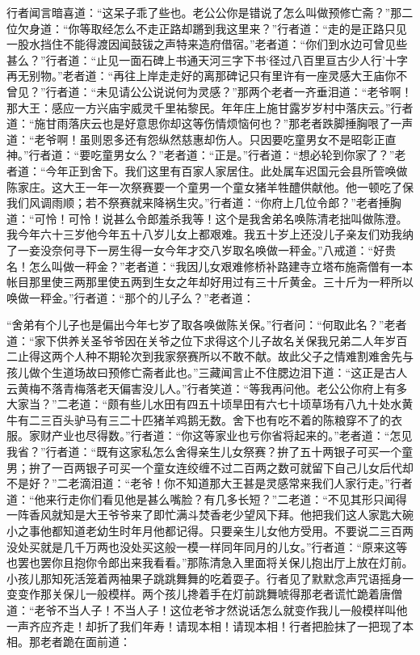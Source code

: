 \documentclass[12pt,UTF8]{ctexbook}
\begin{document}
行者闻言暗喜道：“这呆子乖了些也。老公公你是错说了怎么叫做预修亡斋？”那二位欠身道：“你等取经怎么不走正路却蹡到我这里来？”行者道：“走的是正路只见一股水挡住不能得渡因闻鼓钹之声特来造府借宿。”老者道：“你们到水边可曾见些甚么？”行者道：“止见一面石碑上书通天河三字下书‘径过八百里亘古少人行’十字再无别物。”老者道：“再往上岸走走好的离那碑记只有里许有一座灵感大王庙你不曾见？”行者道：“未见请公公说说何为灵感？”那两个老者一齐垂泪道：“老爷啊！那大王：感应一方兴庙宇威灵千里祐黎民。年年庄上施甘露岁岁村中落庆云。”行者道：“施甘雨落庆云也是好意思你却这等伤情烦恼何也？”那老者跌脚捶胸哏了一声道：“老爷啊！虽则恩多还有怨纵然慈惠却伤人。只因要吃童男女不是昭彰正直神。”行者道：“要吃童男女么？”老者道：“正是。”行者道：“想必轮到你家了？”老者道：“今年正到舍下。我们这里有百家人家居住。此处属车迟国元会县所管唤做陈家庄。这大王一年一次祭赛要一个童男一个童女猪羊牲醴供献他。他一顿吃了保我们风调雨顺；若不祭赛就来降祸生灾。”行者道：“你府上几位令郎？”老者捶胸道：“可怜！可怜！说甚么令郎羞杀我等！这个是我舍弟名唤陈清老拙叫做陈澄。我今年六十三岁他今年五十八岁儿女上都艰难。我五十岁上还没儿子亲友们劝我纳了一妾没奈何寻下一房生得一女今年才交八岁取名唤做一秤金。”八戒道：“好贵名！怎么叫做一秤金？”老者道：“我因儿女艰难修桥补路建寺立塔布施斋僧有一本帐目那里使三两那里使五两到生女之年却好用过有三十斤黄金。三十斤为一秤所以唤做一秤金。”行者道：“那个的儿子么？”老者道：

“舍弟有个儿子也是偏出今年七岁了取各唤做陈关保。”行者问：“何取此名？”老者道：“家下供养关圣爷爷因在关爷之位下求得这个儿子故名关保我兄弟二人年岁百二止得这两个人种不期轮次到我家祭赛所以不敢不献。故此父子之情难割难舍先与孩儿做个生道场故曰预修亡斋者此也。”三藏闻言止不住腮边泪下道：“这正是古人云黄梅不落青梅落老天偏害没儿人。”行者笑道：“等我再问他。老公公你府上有多大家当？”二老道：“颇有些儿水田有四五十顷旱田有六七十顷草场有八九十处水黄牛有二三百头驴马有三二十匹猪羊鸡鹅无数。舍下也有吃不着的陈粮穿不了的衣服。家财产业也尽得数。”行者道：“你这等家业也亏你省将起来的。”老者道：“怎见我省？”行者道：“既有这家私怎么舍得亲生儿女祭赛？拚了五十两银子可买一个童男；拚了一百两银子可买一个童女连绞缠不过二百两之数可就留下自己儿女后代却不是好？”二老滴泪道：“老爷！你不知道那大王甚是灵感常来我们人家行走。”行者道：“他来行走你们看见他是甚么嘴脸？有几多长短？”二老道：“不见其形只闻得一阵香风就知是大王爷爷来了即忙满斗焚香老少望风下拜。他把我们这人家匙大碗小之事他都知道老幼生时年月他都记得。只要亲生儿女他方受用。不要说二三百两没处买就是几千万两也没处买这般一模一样同年同月的儿女。”行者道：“原来这等也罢也罢你且抱你令郎出来我看看。”那陈清急入里面将关保儿抱出厅上放在灯前。小孩儿那知死活笼着两袖果子跳跳舞舞的吃着耍子。行者见了默默念声咒语摇身一变变作那关保儿一般模样。两个孩儿搀着手在灯前跳舞唬得那老者谎忙跪着唐僧道：“老爷不当人子！不当人子！这位老爷才然说话怎么就变作我儿一般模样叫他一声齐应齐走！却折了我们年寿！请现本相！请现本相！行者把脸抹了一把现了本相。那老者跪在面前道：
\end{document}
